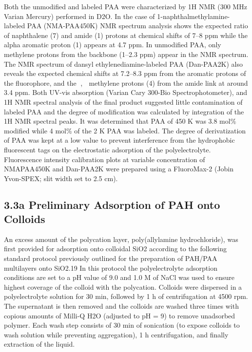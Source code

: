 \documentclass[journal=jacsat,manuscript=article]{achemso}
\begin{document}
Both the unmodified and labeled PAA were characterized by 1H NMR (300 MHz Varian Mercury) performed in D2O.  In the case of 1-naphthalmethylamine-labeled PAA (NMA-PAA450K) NMR spectrum analysis shows the expected ratio of naphthalene (7) and amide (1) protons at chemical shifts of 7–8 ppm while the alpha aromatic proton (1) appears at 4.7 ppm.  In unmodified PAA, only methylene protons from the backbone (1–2.3 ppm) appear in the NMR spectrum.  The NMR spectrum of dansyl ethylenediamine-labeled PAA (Dan-PAA2K) also reveals the expected chemical shifts at 7.2–8.3 ppm from the aromatic protons of the fluorophore, and the ,  methylene protons (4) from the amide link at around 3.4 ppm.  Both UV-vis absorption (Varian Cary 300-Bio Spectrophotometer), and 1H NMR spectral analysis of the final product suggested little contamination of labeled PAA and the degree of modification was calculated by integration of the 1H NMR spectral peaks.  It was determined that PAA of 450 K was 3.8 mol\% modified while 4 mol\% of the 2 K PAA was labeled.  The degree of derivatization of PAA was kept at a low value to prevent interference from the hydrophobic fluorescent tags on the electrostatic adsorption of the polyelectrolyte.  Fluorescence intensity calibration plots at variable concentration of NMAPAA450K and Dan-PAA2K were prepared using a FluoroMax-2 (Jobin Yvon-SPEX; slit width set to 2.5 cm). 

\subsection{3.3a Preliminary Adsorption of PAH onto Colloids}

An excess amount of the polycation layer, poly(allylamine hydrochloride), was first provided for adsorption onto colloidal SiO2 according to the following standard protocol previously outlined for the preparation of PAH/PAA multilayers onto SiO2.19  In this protocol the polyelectrolyte adsorption conditions are set to a pH value of 9.0 and 1.0 M of NaCl was used to ensure highest coverage of the colloid with the polycation.  Colloids were dispersed in a polyelectrolyte solution for 30 min, followed by 1 h of centrifugation at 4500 rpm.  The supernatant is then removed and the colloids are washed three times with copious amounts of Milli-Q H2O (adjusted to pH = 9) to remove unadsorbed polymer.  Each wash step consists of 30 min of sonication (to expose colloids to wash solution while preventing aggregation), 1 h centrifugation, and finally extraction of the liquid.  
\end{document}
